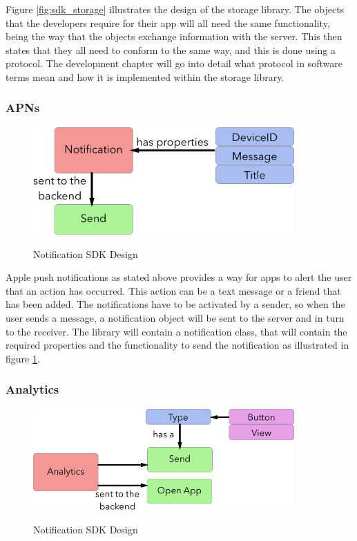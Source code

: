 Figure \ref{fig:sdk_storage} illustrates the design of the storage library. The objects that the developers require for their app will all need the same functionality, being the way that the objects exchange information with the server. This then states that they all need to conform to the same way, and this is done using a protocol. The development chapter will go into detail what protocol in software terms mean and how it is implemented within the storage library.

\subsubsection{APNs} \label{d-sdk:apns}

\begin{figure}[!h]
    \caption{Notification SDK Design}
    \centering
    \includegraphics[width=100mm]{images/design/notification}
    \label{fig:apns_storage}
\end{figure}

Apple push notifications as stated above provides a way for apps to alert the user that an action has occurred. This action can be a text message or a friend that has been added. The notifications have to be activated by a sender, so when the user sends a message, a notification object will be sent to the server and in turn to the receiver. The library will contain a notification class, that will contain the required properties and the functionality to send the notification as illustrated in figure \ref{fig:apns_storage}.

\subsubsection{Analytics} \label{d-sdk:analytics}

\begin{figure}[!h]
    \caption{Notification SDK Design}
    \centering
    \includegraphics[width=100mm]{images/design/analytics}
    \label{fig:analytics_design}
\end{figure}

